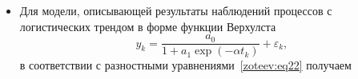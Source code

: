 \begin{itemize}
\begin{gather}
\begin{bmatrix}
0 & 0 & 0 & 1 \\
y_1 & -(2y_2-\lambda_1y_1) & 0 & 0 \\
y_2 & -(3y_3-\lambda_1 2y_2+y_1) & 0 & 0 \\
\vdots & \vdots & \vdots & \vdots \\
y_{N-2} & -[(N-1)y_{N-1}-\lambda_1(N-2)y_{N-2}+(N-3)y_{N-3}] & 0 & 0
\end{bmatrix},
\\
P_\lambda=
\left[
\begin{array}{ccc}
1 & 0 & 0  \\
0 & 1 & 0  \\
1 & -\lambda_1(1+\lambda_2) & 1+2\lambda_2\\
0 & 1+\lambda_2 & -\lambda_1(1+2\lambda_2)  \\
0 & 0 & 1+2\lambda_2  \\
\vdots & \vdots & \vdots  \\
0 & 0 & 0 \\
\end{array}\right. \hspace{5cm}
\label{zoteev:eq26}
\\
\hspace{2cm}
\left.
\begin{array}{ccc} 
 0 & \cdots & 0 \\
  0 & \cdots & 0 \\
  0 & \cdots & 0 \\
  1+3\lambda_2 & \cdots & 0 \\
  -\lambda_1(1+3\lambda_2) & \cdots & 0 \\
  \vdots & \ddots & \vdots \\ 
  1+(N-3)\lambda_2 & -\lambda_1[1+(N-2)\lambda_2] & 1+(N-1)\lambda_2 \\
\end{array}\right].
\end{gather}
\item[3.]
Для модели, описывающей результаты наблюдений процессов с логистических трендом в форме функции Верхулста
$$
y_k=\dfrac{a_0}{1+a_1\exp(-\alpha t_k)}+\varepsilon_k,
$$ 
в соответствии с разностными уравнениями~\eqref{zoteev:eq22} получаем


\end{itemize}
